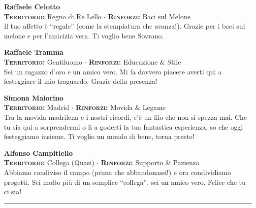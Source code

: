 \noindent\begin{minipage}{\linewidth}
\textbf{Raffaele Celotto} \\
{\footnotesize \textbf{\textsc{Territorio:}} Regno di Re Lello $\cdot$ \textbf{\textsc{Rinforzi:}} Baci sul Melone} \\
Il tuo affetto è ``regale'' (come la stempiatura che avanza!). Grazie per i baci sul melone e per l'amicizia vera. Ti voglio bene Sovrano.
\end{minipage}
\vspace{0.6cm}

\noindent\begin{minipage}{\linewidth}
\textbf{Raffaele Tramma} \\
{\footnotesize \textbf{\textsc{Territorio:}} Gentiluomo $\cdot$ \textbf{\textsc{Rinforzi:}} Educazione \& Stile} \\
Sei un ragazzo d'oro e un amico vero. Mi fa davvero piacere averti qui a festeggiare il mio traguardo. Grazie della presenza!
\end{minipage}
\vspace{0.6cm}

\noindent\begin{minipage}{\linewidth}
\textbf{Simona Maiorino} \\
{\footnotesize \textbf{\textsc{Territorio:}} Madrid $\cdot$ \textbf{\textsc{Rinforzi:}} Movida \& Legame} \\
Tra la movida madrilena e i nostri ricordi, c'è un filo che non si spezza mai. Che tu sia qui a sorprendermi o lì a goderti la tua fantastica esperienza, so che oggi festeggiamo insieme. Ti voglio un mondo di bene, torna presto!
\end{minipage}
\vspace{0.6cm}

\noindent\begin{minipage}{\linewidth}
\textbf{Alfonso Campitiello} \\
{\footnotesize \textbf{\textsc{Territorio:}} Collega (Quasi) $\cdot$ \textbf{\textsc{Rinforzi:}} Supporto \& Pazienza} \\
Abbiamo condiviso il campo (prima che abbandonassi!) e ora condividiamo progetti. Sei molto più di un semplice ``collega'', sei un amico vero. Felice che tu ci sia!
\end{minipage}

\vspace{0.6cm}
\begin{center} \rule{0.5\linewidth}{0.5pt} \end{center}

